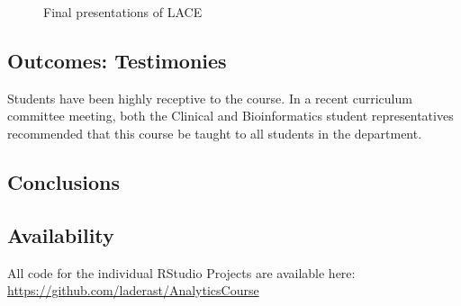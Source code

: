 \begin{Schunk}
\begin{figure}

{\centering {}\newline{}

}

\caption[Final presentations of LACE]{Final presentations of LACE}\label{fig:presentations}
\end{figure}
\end{Schunk}

\hypertarget{outcomes-testimonies}{%
\subsection{Outcomes: Testimonies}\label{outcomes-testimonies}}

Students have been highly receptive to the course. In a recent
curriculum committee meeting, both the Clinical and Bioinformatics
student representatives recommended that this course be taught to all
students in the department.

\hypertarget{conclusions}{%
\subsection{Conclusions}\label{conclusions}}

\hypertarget{availability}{%
\subsection{Availability}\label{availability}}

All code for the individual RStudio Projects are available here:
\url{https://github.com/laderast/AnalyticsCourse}



\address{%
Ted Laderas\\
Medical Informatics and Clinical Epidemiology, Oregon Health \& Science
University\\%
3181 S.W. Sam Jackson Park Road, BICC\\ Portland, OR 97239, United
States of America\\
%
\url{https://laderast.github.io}%
\\\textit{ORCiD: \href{https://orcid.org/0000-0002-9079-593X}{0000-0002-9079-593X}}%
\\\href{mailto:tedladeras@gmail.com}{\nolinkurl{tedladeras@gmail.com}}
}

\address{%
Brian Sikora\\
Kaiser Permanente Insight\\%
line 1 affiliation 1\\ line 2 affiliation 1\\
%
\url{https://journal.r-project.org}%
\\\textit{ORCiD: \href{https://orcid.org/0000-0002-9079-593X}{0000-0002-9079-593X}}%
\\\href{mailto:author2@work}{\nolinkurl{author2@work}}
}
